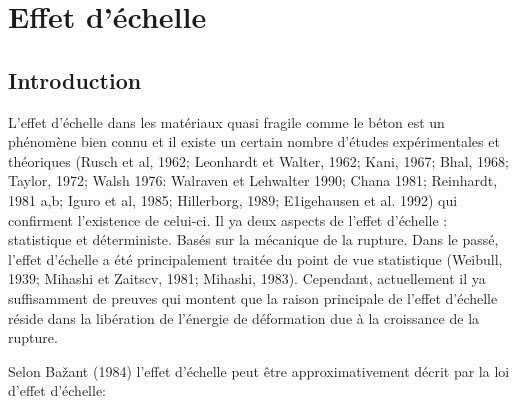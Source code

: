 \documentclass[12pt]{report}
\begin{document}
\chapter{Effet d'échelle}

\section{Introduction}
L'effet d’échelle dans les matériaux quasi fragile comme le béton est un phénomène bien connu
et il existe un certain nombre d'études expérimentales et théoriques (Rusch et al, 1962; Leonhardt
et Walter, 1962; Kani, 1967; Bhal, 1968; Taylor, 1972; Walsh 1976: Walraven et Lehwalter
1990; Chana 1981; Reinhardt, 1981 a,b; Iguro et al, 1985; Hillerborg, 1989; E1igehausen et al.
1992) qui confirment l'existence de celui-ci. Il ya deux aspects de l'effet d’échelle : statistique et
déterministe. Basés sur la mécanique de la rupture. Dans le passé, l'effet d’échelle a été
principalement traitée du point de vue statistique (Weibull, 1939; Mihashi et Zaitscv, 1981;
Mihashi, 1983). Cependant, actuellement il ya suffisamment de preuves qui montent que la
raison principale de l'effet d’échelle réside dans la libération de l'énergie de déformation due à la
croissance de la rupture.

Selon Bažant (1984) l'effet d’échelle peut être approximativement décrit par la loi d’effet
d’échelle:

 
\end{document}
